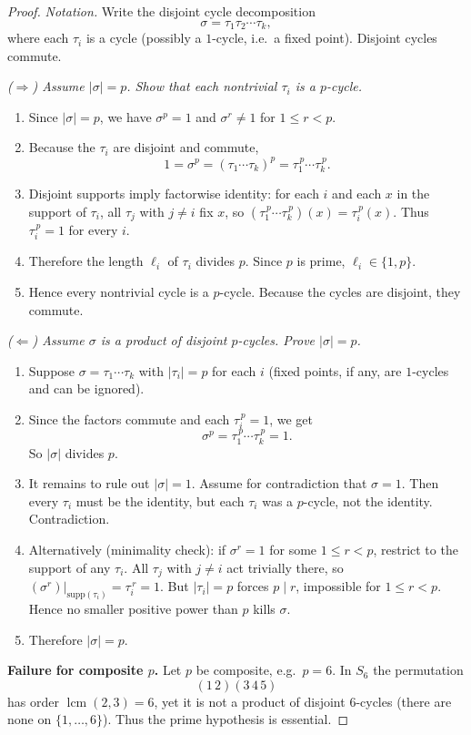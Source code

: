 \documentclass[12pt]{article}
\theoremstyle{definition}
\begin{document}
\begin{proof}
\emph{Notation.} Write the disjoint cycle decomposition
\[
\sigma=\tau_1\tau_2\cdots\tau_k,
\]
where each $\tau_i$ is a cycle (possibly a $1$-cycle, i.e.\ a fixed point). Disjoint cycles commute.

\smallskip

\noindent\emph{($\Rightarrow$) Assume $|\sigma|=p$. Show that each nontrivial $\tau_i$ is a $p$-cycle.}
\begin{enumerate}
\item Since $|\sigma|=p$, we have $\sigma^p=1$ and $\sigma^r\neq 1$ for $1\le r<p$.
\item Because the $\tau_i$ are disjoint and commute,
\[
1=\sigma^p=(\tau_1\cdots\tau_k)^p=\tau_1^{\,p}\cdots\tau_k^{\,p}.
\]
\item Disjoint supports imply factorwise identity: for each $i$ and each $x$ in the support of $\tau_i$,
all $\tau_j$ with $j\neq i$ fix $x$, so $(\tau_1^{\,p}\cdots\tau_k^{\,p})(x)=\tau_i^{\,p}(x)$.
Thus $\tau_i^{\,p}=1$ for every $i$.
\item Therefore the length $\ell_i$ of $\tau_i$ divides $p$. Since $p$ is prime, $\ell_i\in\{1,p\}$.
\item Hence every nontrivial cycle is a $p$-cycle. Because the cycles are disjoint, they commute.
\end{enumerate}

\smallskip

\noindent\emph{($\Leftarrow$) Assume $\sigma$ is a product of disjoint $p$-cycles. Prove $|\sigma|=p$.}
\begin{enumerate}
\item Suppose $\sigma=\tau_1\cdots\tau_k$ with $|\tau_i|=p$ for each $i$ (fixed points, if any, are $1$-cycles and can be ignored).
\item Since the factors commute and each $\tau_i^{\,p}=1$, we get
\[
\sigma^{p}=\tau_1^{\,p}\cdots\tau_k^{\,p}=1.
\]
So $|\sigma|$ divides $p$.
\item It remains to rule out $|\sigma|=1$. Assume for contradiction that $\sigma=1$.
Then every $\tau_i$ must be the identity, but each $\tau_i$ was a $p$-cycle, not the identity. Contradiction.
\item Alternatively (minimality check): if $\sigma^{r}=1$ for some $1\le r<p$, restrict to the support of any $\tau_i$.
All $\tau_j$ with $j\neq i$ act trivially there, so $(\sigma^{r})|_{\mathrm{supp}(\tau_i)}=\tau_i^{\,r}=1$.
But $|\tau_i|=p$ forces $p\mid r$, impossible for $1\le r<p$. Hence no smaller positive power than $p$ kills $\sigma$.
\item Therefore $|\sigma|=p$.
\end{enumerate}

\smallskip

\noindent\textbf{Failure for composite $p$.}
Let $p$ be composite, e.g.\ $p=6$. In $S_{6}$ the permutation
\[
(1\,2)(3\,4\,5)
\]
has order $\operatorname{lcm}(2,3)=6$, yet it is not a product of disjoint $6$-cycles (there are none on $\{1,\dots,6\}$).
Thus the prime hypothesis is essential.
\end{proof}
\end{document}
